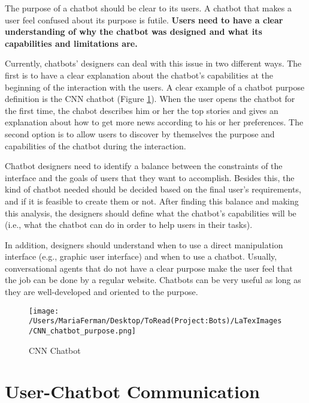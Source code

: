 \documentclass[a4paper,10pt]{article}
\begin{document}
The purpose of a chatbot should be clear to its users. A chatbot that makes a user feel confused about its purpose is futile. \textbf{Users need to have a clear understanding of why the chatbot was designed and what its capabilities and limitations are.}

Currently, chatbots' designers can deal with this issue in two different ways. The first is to have a clear explanation about the chatbot's capabilities at the beginning of the interaction with the users. A clear example of a chatbot purpose definition is the CNN chatbot (Figure \ref{FigurePurpose}). When the user opens the chatbot for the first time, the chabot describes him or her the top stories and gives an explanation about how to get more news according to his or her preferences. The second option is to allow users to discover by themselves the purpose and capabilities of the chatbot during the interaction.

Chatbot designers need to identify a balance between the constraints of the interface and the goals of users that they want to accomplish. Besides this, the kind of chatbot needed should be decided based on the final user's requirements, and if it is feasible to create them or not. After finding this balance and making this analysis, the designers should define what the chatbot's capabilities will be (i.e., what the chatbot can do in order to help users in their tasks). 

In addition, designers should understand when to use a direct manipulation interface (e.g., graphic user interface) and when to use a chatbot. Usually, conversational agents that do not have a clear purpose make the user feel that the job can be done by a regular website. Chatbots can be very useful as long as they are well-developed and oriented to the purpose.  


\begin{figure}
\centering
\texttt{[image: /Users/MariaFerman/Desktop/ToRead(Project:Bots)/LaTexImages/CNN\_chatbot\_purpose.png]}
\caption{CNN Chatbot}
\label{FigurePurpose}
\end{figure}

\section*{User-Chatbot Communication}
\end{document}
